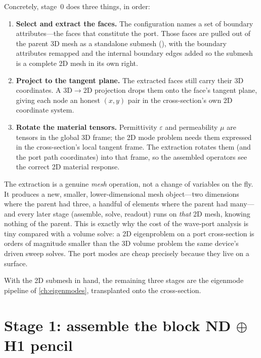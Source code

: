 Concretely, stage~0 does three things, in order:
\begin{enumerate}[nosep]
  \item \textbf{Select and extract the faces.} The configuration names a set of
  boundary attributes---the faces that constitute the port. Those faces are pulled
  out of the parent 3D mesh as a standalone submesh (),
  with the boundary attributes remapped and the internal boundary edges added so
  the submesh is a complete 2D mesh in its own right.
  \item \textbf{Project to the tangent plane.} The extracted faces still carry
  their 3D coordinates. A 3D$\to$2D projection drops them onto the face's tangent
  plane, giving each node an honest $(x,y)$ pair in the cross-section's own 2D
  coordinate system.
  \item \textbf{Rotate the material tensors.} Permittivity $\varepsilon$ and
  permeability $\mu$ are tensors in the global 3D frame; the 2D mode problem needs
  them expressed in the cross-section's local tangent frame. The extraction
  rotates them (and the port path coordinates) into that frame, so the assembled
  operators see the correct 2D material response.
\end{enumerate}

\begin{notationbox}
The extraction is a genuine \emph{mesh} operation, not a change of variables on the
fly. It produces a new, smaller, lower-dimensional mesh object---two dimensions
where the parent had three, a handful of elements where the parent had many---and
every later stage (assemble, solve, readout) runs on \emph{that} 2D mesh, knowing
nothing of the parent. This is exactly why the cost of the wave-port analysis is
tiny compared with a volume solve: a 2D eigenproblem on a port cross-section is
orders of magnitude smaller than the 3D volume problem the same device's driven
sweep solves. The port modes are cheap precisely because they live on a surface.
\end{notationbox}

With the 2D submesh in hand, the remaining three stages are the eigenmode pipeline
of \cref{ch:eigenmodes}, transplanted onto the cross-section.

\section{Stage 1: assemble the block ND$\,\oplus\,$H1 pencil}
\label{sec:assemble}

